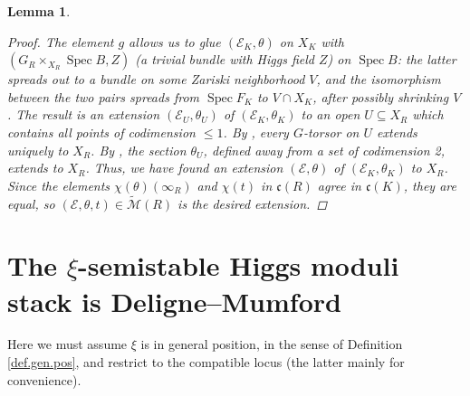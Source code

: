 \documentclass[openany]{amsbook}
\newtheorem{lemma}[theorem]{Lemma}
\theoremstyle{definition}
\theoremstyle{remark}
\numberwithin{equation}{section}
\newcommand{\cM}{\mathcal{M}}
\newcommand{\cE}{\mathcal{E}}
\renewcommand{\-}{\operatorname{-}}
\newcommand{\Spec}{\operatorname{Spec}}
\newcommand{\ctM}{\widetilde{\cM}}
\newcommand{\fc}{\mathfrak{c}}
\begin{document}
\begin{lemma}
\begin{proof}
    The element $g$ allows us to glue $(\cE_K, \theta)$ on $X_K$ with $(G_R \times_{X_R} \Spec B, Z)$ (a trivial bundle with Higgs field $Z$) on $\Spec B$: the latter spreads out to a bundle on some Zariski neighborhood $V$, and the isomorphism between the two pairs spreads from $\Spec F_K$ to $V \cap X_K$, after possibly shrinking $V$. The result is an extension $(\cE_U, \theta_U)$ of $(\cE_K, \theta_K)$ to an open $U \subseteq X_R$ which contains all points of codimension $\le 1$. By \cite[Thm. 6.13]{collsantors}, every $G$-torsor on $U$ extends uniquely to $X_R$. By \cite[IV, Cor. 20.4.12]{EGA}, the section $\theta_U$, defined away from a set of codimension 2, extends to $X_R$. Thus, we have found an extension $(\cE, \theta)$ of $(\cE_K, \theta_K)$ to $X_R$. Since the elements $\chi(\theta)(\infty_R)$ and $\chi(t)$ in $\fc(R)$ agree in $\fc(K)$, they are equal, so $(\cE, \theta, t) \in \ctM(R)$ is the desired extension.
\end{proof}
\end{lemma}












\chapter{\texorpdfstring{The $\xi$-semistable Higgs moduli stack is Deligne--Mumford}{The xi-semistable Higgs moduli stack is Deligne--Mumford}}\label{sect.Deligne.Mumford}

Here we must assume $\xi$ is in general position, in the sense of Definition \ref{def.gen.pos}, and restrict to the compatible locus (the latter mainly for convenience).
\end{document}
